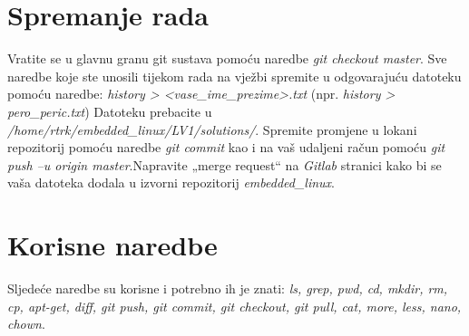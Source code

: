 \documentclass[11pt]{article}
\begin{document}
\section{Spremanje rada}
Vratite se u glavnu granu git sustava pomoću naredbe
 \textit{git checkout master}. Sve naredbe koje ste unosili tijekom rada na
 vježbi spremite u odgovarajuću datoteku pomoću naredbe:
\newline
\newline
\textit{history > <vase\_ime\_prezime>.txt} (npr.
\textit{history > pero\_peric.txt})
\newline
\newline
Datoteku prebacite u \textit{/home/rtrk/embedded\_linux/LV1/solutions/}.
 Spremite promjene u lokani repozitorij pomoću naredbe \textit{git commit} kao
 i na vaš udaljeni račun pomoću \textit{git push –u origin master}.Napravite
 „merge request“ na \textit{Gitlab} stranici kako bi se vaša datoteka
 dodala u izvorni repozitorij \textit{embedded\_linux}.
 \section{Korisne naredbe}
Sljedeće naredbe su korisne i potrebno ih je znati: \textit{ls, grep, pwd, cd,
 mkdir, rm, cp, apt-get, diff, git push, git commit, git checkout, git pull,
 cat, more, less, nano, chown}.
\end{document}
